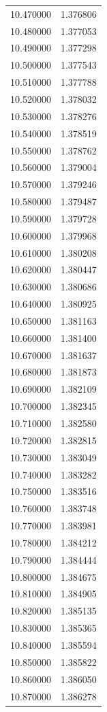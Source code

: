 \begin{tabular}{rr}
10.470000 & 1.376806 \\
10.480000 & 1.377053 \\
10.490000 & 1.377298 \\
10.500000 & 1.377543 \\
10.510000 & 1.377788 \\
10.520000 & 1.378032 \\
10.530000 & 1.378276 \\
10.540000 & 1.378519 \\
10.550000 & 1.378762 \\
10.560000 & 1.379004 \\
10.570000 & 1.379246 \\
10.580000 & 1.379487 \\
10.590000 & 1.379728 \\
10.600000 & 1.379968 \\
10.610000 & 1.380208 \\
10.620000 & 1.380447 \\
10.630000 & 1.380686 \\
10.640000 & 1.380925 \\
10.650000 & 1.381163 \\
10.660000 & 1.381400 \\
10.670000 & 1.381637 \\
10.680000 & 1.381873 \\
10.690000 & 1.382109 \\
10.700000 & 1.382345 \\
10.710000 & 1.382580 \\
10.720000 & 1.382815 \\
10.730000 & 1.383049 \\
10.740000 & 1.383282 \\
10.750000 & 1.383516 \\
10.760000 & 1.383748 \\
10.770000 & 1.383981 \\
10.780000 & 1.384212 \\
10.790000 & 1.384444 \\
10.800000 & 1.384675 \\
10.810000 & 1.384905 \\
10.820000 & 1.385135 \\
10.830000 & 1.385365 \\
10.840000 & 1.385594 \\
10.850000 & 1.385822 \\
10.860000 & 1.386050 \\
10.870000 & 1.386278 \\

\end{tabular}
